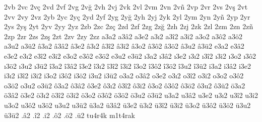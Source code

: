 {2vb
2vc
2vç
2vd
2vf
2vg
2vğ
2vh
2vj
2vk
2vl
2vm
2vn
2vñ
2vp
2vr
2vs
2vş
2vt
2vv
2vy
2vz
2yb
2yc
2yç
2yd
2yf
2yg
2yğ
2yh
2yj
2yk
2yl
2ym
2yn
2yñ
2yp
2yr
2ys
2yş
2yt
2yv
2yy
2yz
2zb
2zc
2zç
2zd
2zf
2zg
2zğ
2zh
2zj
2zk
2zl
2zm
2zn
2zñ
2zp
2zr
2zs
2zş
2zt
2zv
2zy
2zz
a3a2
a3â2
a3e2
a3ı2
a3î2
a3i2
a3o2
a3ô2
a3ö2
a3u2
a3ü2
â3a2
â3â2
â3e2
â3ı2
â3î2
â3i2
â3o2
â3ô2
â3ö2
â3u2
â3ü2
e3a2
e3â2
e3e2
e3ı2
e3î2
e3i2
e3o2
e3ô2
e3ö2
e3u2
e3ü2
ı3a2
ı3â2
ı3e2
ı3ı2
ı3î2
ı3i2
ı3o2
ı3ô2
ı3ö2
ı3u2
ı3ü2
î3a2
î3â2
î3e2
î3ı2
î3î2
î3i2
î3o2
î3ô2
î3ö2
î3u2
î3ü2
i3a2
i3â2
i3e2
i3ı2
i3î2
i3i2
i3o2
i3ô2
i3ö2
i3u2
i3ü2
o3a2
o3â2
o3e2
o3ı2
o3î2
o3i2
o3o2
o3ô2
o3ö2
o3u2
o3ü2
ô3a2
ô3â2
ô3e2
ô3ı2
ô3î2
ô3i2
ô3o2
ô3ô2
ô3ö2
ô3u2
ô3ü2
ö3a2
ö3â2
ö3e2
ö3ı2
ö3î2
ö3i2
ö3o2
ö3ô2
ö3ö2
ö3u2
ö3ü2
u3a2
u3â2
u3e2
u3ı2
u3î2
u3i2
u3o2
u3ô2
u3ö2
u3u2
u3ü2
ü3a2
ü3â2
ü3e2
ü3ı2
ü3î2
ü3i2
ü3o2
ü3ô2
ü3ö2
ü3u2
ü3ü2
.â2
.î2
.i2
.ô2
.ö2
.ü2
tu4r4k
m1t4rak
}
